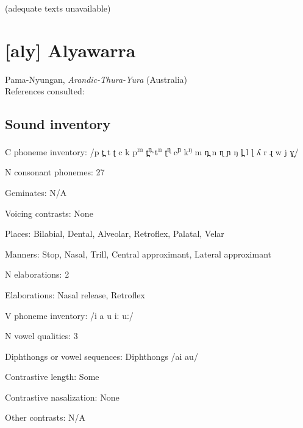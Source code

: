 {(adequate texts unavailable)

\section*{[aly] Alyawarra}  %
Pama-Nyungan, \textit{Arandic-Thura-Yura} (Australia)\medskip\\
References consulted: \citet{Yallop1977}

\subsection*{Sound inventory}
\begin{appendixdesc}

\item[C phoneme inventory:] /p t̪ t ʈ c k p\textsuperscript{m} t̪\textsuperscript{n̪} t\textsuperscript{n} ʈ\textsuperscript{ɳ} c\textsuperscript{ɲ} k\textsuperscript{ŋ} m n̪ n ɳ ɲ ŋ l̪ l ɭ ʎ r ɻ w j ɣ̞/

\item[N consonant phonemes:] 27

\item[Geminates:] N/A

\item[Voicing contrasts:] None

\item[Places:] Bilabial, Dental, Alveolar, Retroflex, Palatal, Velar

\item[Manners:] Stop, Nasal, Trill, Central approximant, Lateral approximant

\item[N elaborations:] 2

\item[Elaborations:] Nasal release, Retroflex

\item[V phoneme inventory:] /i a u iː uː/

\item[N vowel qualities:] 3

\item[Diphthongs or vowel sequences:] Diphthongs /ai au/

\item[Contrastive length:] Some

\item[Contrastive nasalization:] None

\item[Other contrasts:] N/A


\end{appendixdesc}}
